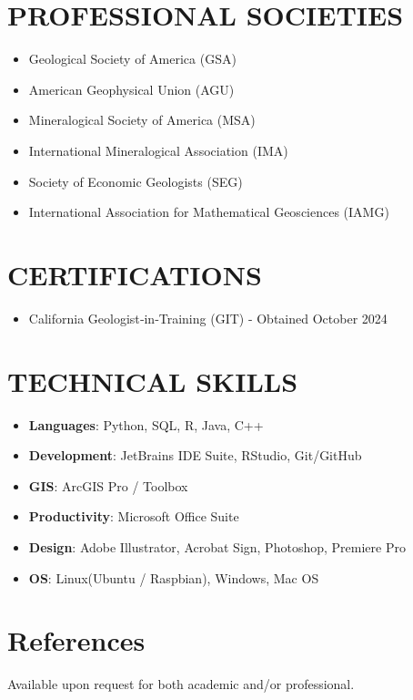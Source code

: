\documentclass{res} %
\begin{document}
\begin{resume}
\begin{enumerate}
\end{enumerate}

\section{\Large{PROFESSIONAL SOCIETIES}} 

\begin{itemize}
    \item Geological Society of America (GSA)
    \item American Geophysical Union (AGU)
    \item Mineralogical Society of America (MSA)
    \item International Mineralogical Association (IMA)
    \item Society of Economic Geologists (SEG)
    \item International Association for Mathematical Geosciences  (IAMG)
\end{itemize}

\section{\Large{CERTIFICATIONS}} 

\begin{itemize}

    \item California Geologist‑in‑Training (GIT) - Obtained October 2024
\end{itemize}


\section{\Large{TECHNICAL SKILLS}}


\begin{itemize}
  \item \textbf{Languages}: Python, SQL, R, Java, C++
  \item \textbf{Development}: JetBrains IDE Suite, RStudio, Git/GitHub
  \item \textbf{GIS}: ArcGIS Pro / Toolbox
  \item \textbf{Productivity}: Microsoft Office Suite
  \item \textbf{Design}: Adobe Illustrator, Acrobat Sign, Photoshop, Premiere Pro
  \item \textbf{OS}: Linux(Ubuntu / Raspbian), Windows, Mac OS
\end{itemize}

\section{\Large{References}}

Available upon request for both academic and/or professional.

\end{resume}
\end{document}
